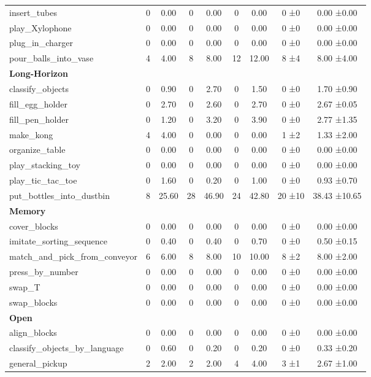 \begin{table}[H]
{\begin{tabular}{l|c|c|c|c|c|c|c|c}
insert\_tubes & 0 & 0.00 & 0 & 0.00 & 0 & 0.00 & 0 ±0 & 0.00 ±0.00 \\
play\_Xylophone & 0 & 0.00 & 0 & 0.00 & 0 & 0.00 & 0 ±0 & 0.00 ±0.00 \\
plug\_in\_charger & 0 & 0.00 & 0 & 0.00 & 0 & 0.00 & 0 ±0 & 0.00 ±0.00 \\
pour\_balls\_into\_vase & 4 & 4.00 & 8 & 8.00 & 12 & 12.00 & 8 ±4 & 8.00 ±4.00 \\
\hline
\multicolumn{9}{l}{\textbf{Long-Horizon}} \\
classify\_objects & 0 & 0.90 & 0 & 2.70 & 0 & 1.50 & 0 ±0 & 1.70 ±0.90 \\
fill\_egg\_holder & 0 & 2.70 & 0 & 2.60 & 0 & 2.70 & 0 ±0 & 2.67 ±0.05 \\
fill\_pen\_holder & 0 & 1.20 & 0 & 3.20 & 0 & 3.90 & 0 ±0 & 2.77 ±1.35 \\
make\_kong & 4 & 4.00 & 0 & 0.00 & 0 & 0.00 & 1 ±2 & 1.33 ±2.00 \\
organize\_table & 0 & 0.00 & 0 & 0.00 & 0 & 0.00 & 0 ±0 & 0.00 ±0.00 \\
play\_stacking\_toy & 0 & 0.00 & 0 & 0.00 & 0 & 0.00 & 0 ±0 & 0.00 ±0.00 \\
play\_tic\_tac\_toe & 0 & 1.60 & 0 & 0.20 & 0 & 1.00 & 0 ±0 & 0.93 ±0.70 \\
put\_bottles\_into\_dustbin & 8 & 25.60 & 28 & 46.90 & 24 & 42.80 & 20 ±10 & 38.43 ±10.65 \\
\hline
\multicolumn{9}{l}{\textbf{Memory}} \\
cover\_blocks & 0 & 0.00 & 0 & 0.00 & 0 & 0.00 & 0 ±0 & 0.00 ±0.00 \\
imitate\_sorting\_sequence & 0 & 0.40 & 0 & 0.40 & 0 & 0.70 & 0 ±0 & 0.50 ±0.15 \\
match\_and\_pick\_from\_conveyor & 6 & 6.00 & 8 & 8.00 & 10 & 10.00 & 8 ±2 & 8.00 ±2.00 \\
press\_by\_number & 0 & 0.00 & 0 & 0.00 & 0 & 0.00 & 0 ±0 & 0.00 ±0.00 \\
swap\_T & 0 & 0.00 & 0 & 0.00 & 0 & 0.00 & 0 ±0 & 0.00 ±0.00 \\
swap\_blocks & 0 & 0.00 & 0 & 0.00 & 0 & 0.00 & 0 ±0 & 0.00 ±0.00 \\
\hline
\multicolumn{9}{l}{\textbf{Open}} \\
align\_blocks & 0 & 0.00 & 0 & 0.00 & 0 & 0.00 & 0 ±0 & 0.00 ±0.00 \\
classify\_objects\_by\_language & 0 & 0.60 & 0 & 0.20 & 0 & 0.20 & 0 ±0 & 0.33 ±0.20 \\
general\_pickup & 2 & 2.00 & 2 & 2.00 & 4 & 4.00 & 3 ±1 & 2.67 ±1.00 \\

\end{tabular}}
\end{table}
